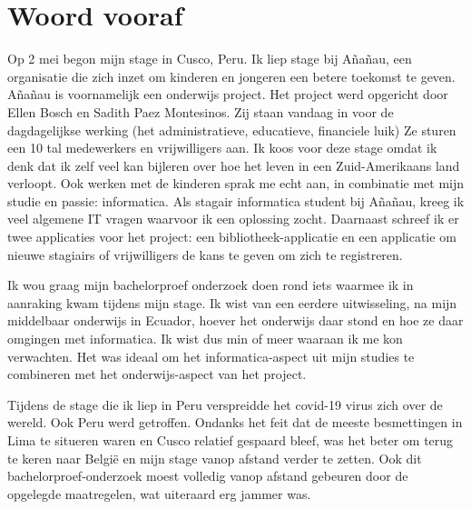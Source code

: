 
\chapter*{Woord vooraf}
\label{ch:voorwoord}


Op 2 mei begon mijn stage in Cusco, Peru. Ik liep stage bij Añañau, een organisatie die zich inzet om kinderen en jongeren een betere toekomst te geven. Añañau is voornamelijk een onderwijs project. Het project werd opgericht door Ellen Bosch en Sadith Paez Montesinos. Zij staan vandaag in voor de dagdagelijkse werking (het administratieve, educatieve, financiele luik) Ze sturen een 10 tal medewerkers en vrijwilligers aan. Ik koos voor deze stage omdat ik denk dat ik zelf veel kan bijleren over hoe het leven in een Zuid-Amerikaans land verloopt. Ook werken met de kinderen sprak me echt aan, in combinatie met mijn studie en passie: informatica. Als stagair informatica student bij Añañau, kreeg ik veel algemene IT vragen waarvoor ik een oplossing zocht. Daarnaast schreef ik er twee applicaties voor het project: een bibliotheek-applicatie en een applicatie om nieuwe stagiairs of vrijwilligers de kans te geven om zich te registreren. 

Ik wou graag mijn bachelorproef onderzoek doen rond iets waarmee ik in aanraking kwam tijdens mijn stage. Ik wist van een eerdere uitwisseling, na mijn middelbaar onderwijs in Ecuador, hoever het onderwijs daar stond en hoe ze daar omgingen met informatica. Ik wist dus min of meer waaraan ik me kon verwachten. Het was ideaal om het informatica-aspect uit mijn studies te combineren met het onderwijs-aspect van het project. 

Tijdens de stage die ik liep in Peru verspreidde het covid-19 virus zich over de wereld. Ook Peru werd getroffen. Ondanks het feit dat de meeste besmettingen in Lima te situeren waren en Cusco relatief gespaard bleef, was het beter om terug te keren naar België en mijn stage vanop afstand verder te zetten. Ook dit bachelorproef-onderzoek moest volledig vanop afstand gebeuren door de opgelegde maatregelen, wat uiteraard erg jammer was.

